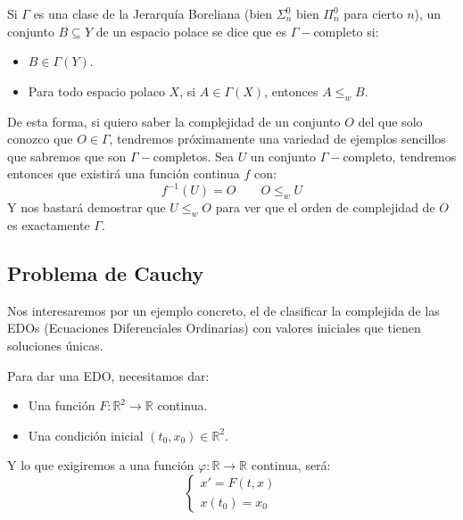 \begin{definicion}
    Si $\Gamma$ es una clase de la Jerarquía Boreliana (bien $\Sigma^0_n$ bien $\Pi^0_n$ para cierto $n$), un conjunto $B\subseteq Y$ de un espacio polace se dice que es $\Gamma-$completo si:
    \begin{itemize}
        \item $B\in \Gamma(Y)$.
        \item Para todo espacio polaco $X$, si $A\in \Gamma(X)$, entonces $A\leq_w B$.
    \end{itemize}
\end{definicion}

De esta forma, si quiero saber la complejidad de un conjunto $O$ del que solo conozco que $O\in \Gamma$, tendremos próximamente una variedad de ejemplos sencillos que sabremos que son $\Gamma-$completos. Sea $U$ un conjunto $\Gamma-$completo, tendremos entonces que existirá una función continua $f$ con:
\begin{equation*}
    f^{-1}(U) = O \qquad O\leq_w U
\end{equation*}
Y nos bastará demostrar que $U\leq_w O$ para ver que el orden de complejidad de $O$ es exactamente $\Gamma$.

\subsection{Problema de Cauchy}
Nos interesaremos por un ejemplo concreto, el de clasificar la complejida de las EDOs (Ecuaciones Diferenciales Ordinarias) con valores iniciales que tienen soluciones únicas.

Para dar una EDO, necesitamos dar:
\begin{itemize}
    \item Una función $F:\mathbb{R}^2\to \mathbb{R}$ continua.
    \item Una condición inicial $(t_0,x_0)\in \mathbb{R}^2$.
\end{itemize}
Y lo que exigiremos a una función $\varphi:\mathbb{R}\to \mathbb{R}$ continua, será:
\begin{equation*}
    \left\{\begin{array}{c}
        x' = F(t,x) \\
        x(t_0) = x_0
    \end{array}\right.
\end{equation*}

